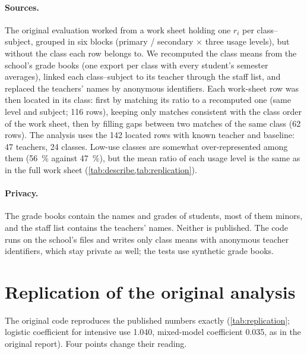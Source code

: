 \documentclass[11pt,a4paper]{article}
\begin{document}
\paragraph{Sources.} The original evaluation worked from a work sheet holding one $r_i$ per class--subject, grouped
in six blocks (primary / secondary $\times$ three usage levels), but without the class each row belongs to. We
recomputed the class means from the school's grade books (one export per class with every student's semester
averages), linked each class--subject to its teacher through the staff list, and replaced the teachers' names by
anonymous identifiers. Each work-sheet row was then located in its class: first by matching its ratio to a
recomputed one (same level and subject; 116 rows), keeping only matches consistent with the class order of the
work sheet, then by filling gaps between two matches of the same class (62 rows). The analysis uses the 142 located
rows with known teacher and baseline: 47 teachers, 24 classes. Low-use classes are somewhat over-represented among
them (\SI{56}{\percent} against \SI{47}{\percent}), but the mean ratio of each usage level is the same as in the full
work sheet (\cref{tab:describe,tab:replication}).

\paragraph{Privacy.} The grade books contain the names and grades of students, most of them minors, and the staff
list contains the teachers' names. Neither is published. The code runs on the school's files and writes only class
means with anonymous teacher identifiers, which stay private as well; the tests use synthetic grade books.

\section{Replication of the original analysis}\label{sec:replication}

The original code reproduces the published numbers exactly (\cref{tab:replication}; logistic coefficient for
intensive use 1.040, mixed-model coefficient 0.035, as in the original report). Four points change their reading.

\begin{table}[t]
  \centering\small
  \caption{Original summary by usage level, replicated from the work sheet. The original code kept the summary rows
    of the work sheet (block mean, maximum, minimum) as if they were classes; removing them changes little.
    $P(r \ge 1)$ is the original definition of improvement, $P(r > 1)$ excludes unchanged classes.}
  \label{tab:replication}
  
\end{table}
\end{document}
